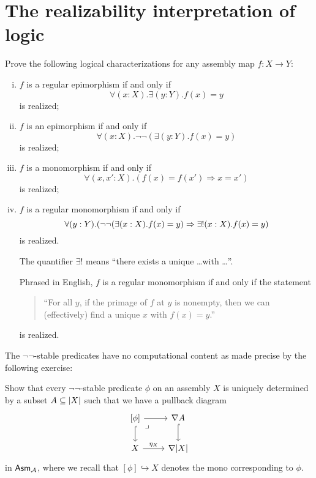 \chapter{The realizability interpretation of logic}\label{chap:logic}

\cite{Lawvere1969}

\begin{exercise}\label{exer:epis-monos-logically}
  Prove the following logical characterizations for any assembly map \(f \colon X \to Y\):
  \begin{enumerate}[(i)]
  \item \(f\) is a regular epimorphism if and only if
    \[
      \forall(x : X).\exists(y : Y).f(x) = y
    \]
    is realized;
  \item \(f\) is an epimorphism if and only if
    \[
      \forall(x : X).\lnot\lnot({\exists(y : Y).f(x) = y})
    \]
    is realized;
  \item \(f\) is a monomorphism if and only if
    \[
      \forall(x, x' : X).(f(x) = f(x') \Rightarrow x = x')
    \]
    is realized;
  \item \(f\) is a regular monomorphism if and only if
    \[
      \forall(y : Y).\pa*{\lnot\lnot\pa*{\exists(x : X).f(x) = y} \Rightarrow \exists!(x : X).f(x) = y}
    \]
    is realized.

    The quantifier \(\exists!\) means ``there exists a unique \dots with \dots''.

    Phrased in English, \(f\) is a regular monomorphism if and only if the statement
    \begin{quote}{``For all \(y\), if the primage of \(f\) at \(y\) is nonempty,
        then we can (effectively) find a unique \(x\) with \(f(x) = y\).''}
    \end{quote}
    is realized.
  \end{enumerate}
\end{exercise}

The \(\lnot\lnot\)-stable predicates have no computational content as made
precise by the following exercise:

\begin{exercise}\label{exer:not-not-stable-nabla-pullback}
  Show that every \(\lnot\lnot\)-stable predicate \(\phi\) on an assembly \(X\)
  is uniquely determined by a subset \(A \subseteq \lvert X\rvert\) such that we
  have a pullback diagram
  \[
    \begin{tikzcd}
      {[\phi]} \ar[r] \ar[d,hookrightarrow] \pbcorner
      & \nabla A \ar[d,hookrightarrow] \\
      X \ar[r,"\eta_X"] & \nabla\carrier{X}
    \end{tikzcd}
  \]
  in \(\mathsf{Asm}_{\mathcal A}\), where we recall that \([\phi] \hookrightarrow X\) denotes
  the mono corresponding to \(\phi\).
\end{exercise}


